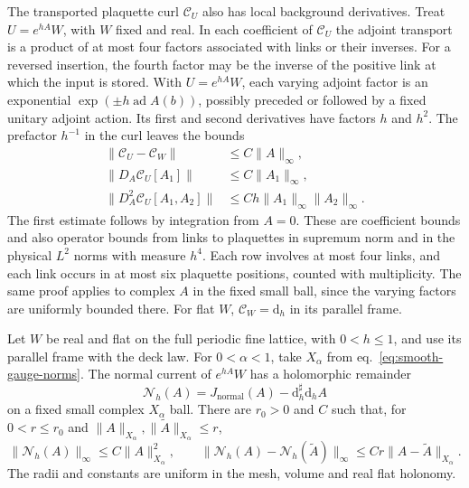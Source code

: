\documentclass[11pt,letterpaper,reqno]{amsart}
\makeatletter
\numberwithin{equation}{section}
\renewcommand{\eqref}[1]{\textup{eq.~\ref{#1}}}
\theoremstyle{definition}
\newcommand{\ms@minorstart}{%
  \pushQED{\qed}\renewcommand{\qedsymbol}{$\blacksquare$}}
\newenvironment{lemma}[1][]{\ms@minorstart\ms@lemma[#1]}
  {\popQED\endms@lemma}
\theoremstyle{remark}
\makeatother
\begin{document}
The transported plaquette curl \(\mathcal C_U\) also has local
background derivatives. Treat \(U=e^{hA}W\), with \(W\) fixed
and real. In each coefficient of \(\mathcal C_U\) the adjoint
transport is a product of at most four factors associated with
links or their inverses. For a reversed insertion, the fourth
factor may be the inverse of the positive link at which the
input is stored. With \(U=e^{hA}W\), each varying adjoint factor
is an exponential \(\exp(\pm h\operatorname{ad}A(b))\),
possibly preceded or followed by a fixed unitary adjoint action.
Its first and second derivatives have factors \(h\) and \(h^2\).
The prefactor \(h^{-1}\) in the curl leaves the bounds
\begin{equation}\label{eq:wilson-curl-coeff-jets}
 \begin{split}
 \|\mathcal C_U-\mathcal C_W\|&\leq C\|A\|_\infty,\\
 \|D_A\mathcal C_U[A_1]\|&\leq C\|A_1\|_\infty,\\
 \|D_A^2\mathcal C_U[A_1,A_2]\|
                         &\leq Ch\|A_1\|_\infty\|A_2\|_\infty .
 \end{split}
\end{equation}
The first estimate follows by integration from \(A=0\).
These are coefficient bounds and also operator bounds from links
to plaquettes in supremum norm and in the physical \(L^2\) norms
with measure \(h^4\). Each row involves at most four links, and each
link occurs in at most six plaquette positions, counted with
multiplicity. The same proof applies to complex \(A\) in the fixed
small ball, since the varying factors are uniformly bounded there.
For flat \(W\), \(\mathcal C_W=\mathrm d_h\) in its parallel frame.

\begin{lemma}[Quadratic Wilson current remainder]\label{lem:wilson-current-remainder}
Let \(W\) be real and flat on the full periodic fine lattice, with
\(0<h\le1\), and use its parallel frame with the deck law.
For \(0<\alpha<1\), take \(X_\alpha\) from
\eqref{eq:smooth-gauge-norms}. The normal current of \(e^{hA}W\)
has a holomorphic remainder
\[
 \mathcal N_h(A)=J_{\mathrm{normal}}(A)-\mathrm d_h^\sharp\mathrm d_h A
\]
on a fixed small complex \(X_\alpha\) ball. There are \(r_0>0\)
and \(C\) such that, for \(0<r\le r_0\) and
\(\|A\|_{X_\alpha},\|\widetilde A\|_{X_\alpha}\le r\),
\begin{equation}\label{eq:wilson-current-remainder}
 \|\mathcal N_h(A)\|_\infty\le C\|A\|_{X_\alpha}^2,\qquad
 \|\mathcal N_h(A)-\mathcal N_h(\widetilde A)\|_\infty
       \le Cr\|A-\widetilde A\|_{X_\alpha}.
\end{equation}
The radii and constants are uniform in the mesh, volume and real
flat holonomy.
\end{lemma}
\end{document}
